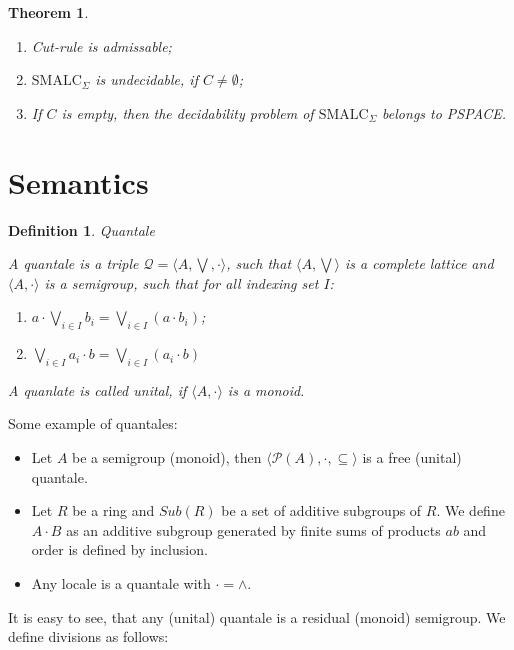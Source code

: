 \documentclass[a4paper]{article}
\theoremstyle{defin}
\newtheorem{defin}{Definition}
\theoremstyle{theorem}
\newtheorem{theorem}{Theorem}
\theoremstyle{prop}
\theoremstyle{lemma}
\theoremstyle{ex}
\theoremstyle{col}
\begin{document}
\begin{theorem}
$ $

  \begin{enumerate}
    \item Cut-rule is admissable;
    \item $\text{SMALC}_{\Sigma}$ is undecidable, if $C \neq \emptyset$;
    \item If $C$ is empty, then the decidability problem of $\text{SMALC}_{\Sigma}$ belongs to PSPACE.
  \end{enumerate}
\end{theorem}

\section{Semantics}

\begin{defin} Quantale
$ $

  A quantale is a triple $\mathcal{Q} = \langle A, \bigvee, \cdot \rangle$, such that $\langle A, \bigvee \rangle$
is a complete lattice and $\langle A, \cdot \rangle$ is a semigroup, such that for all indexing set $I$:

\begin{enumerate}
  \item $a \cdot \bigvee \limits_{i \in I} b_i = \bigvee \limits_{i \in I} (a \cdot b_i)$;
  \item $\bigvee \limits_{i \in I} a_i \cdot b = \bigvee \limits_{i \in I} (a_i \cdot b)$
\end{enumerate}

A quanlate is called unital, if $\langle A, \cdot \rangle$ is a monoid.
\end{defin}

Some example of quantales:

\begin{itemize}
\item Let $A$ be a semigroup (monoid), then $\langle \mathcal{P}(A), \cdot, \subseteq \rangle$
is a free (unital) quantale.
\item Let $R$ be a ring and $Sub(R)$ be a set of additive subgroups of $R$.
We define $A \cdot B$ as an additive subgroup generated by finite sums of products $ab$ and order is defined by inclusion.
\item Any locale is a quantale with $\cdot = \wedge$.
\end{itemize}

It is easy to see, that any (unital) quantale is a residual (monoid) semigroup. We define divisions as follows:
\end{document}
